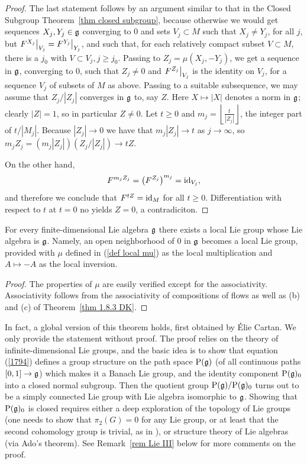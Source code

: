 \begin{proof}
    The last statement follows by an argument similar to that in the Closed Subgroup Theorem~\ref{thm closed subgroup}, because otherwise we would get sequences $X_j,Y_j\in\mathfrak{g}$ converging to $0$ and sets $V_j\subset M$ such that $X_j\neq Y_j$, for all $j$, but $\restr{F^{X_j}}{V_j}=\restr{F^{Y_j}}{Y_j}$, and such that, for each relatively compact subset $V\subset M$, there is a $j_0$ with $V\subset V_j,j\geq j_0$. Passing to $Z_j=\mu(X_j,-Y_j)$, we get a sequence in $\mathfrak{g}$, converging to $0$, such that $Z_j\neq 0$ and $\restr{F^{Z_j}}{V_j}$ is the identity on $V_j$, for a sequence $V_j$ of subsets of $M$ as above. Passing to a suitable subsequence, we may assume that $Z_j/|Z_j|$ converges in $\mathfrak{g}$ to, say $Z$. Here $X\mapsto |X|$ denotes a norm in $\mathfrak{g}$; clearly $|Z|=1$, so in particular $Z\neq 0$. Let $t\geq 0$ and $m_j=\left\lfloor\frac{t}{|Z_j|}\right\rfloor$, the integer part of $t/|M_j|$. Because $|Z_j|\to 0$ we have that $m_j|Z_j|\to t$ as $j\to \infty$, so $m_j Z_j=(m_j|Z_j|)(Z_j/|Z_j|)\to tZ$.

    On the other hand,
    \[F^{m_jZ_j}=\left(F^{Z_j}\right)^{m_j}=\operatorname{id}_{V_j},\]
    and therefore we conclude that $F^{tZ}=\operatorname{id}_{M}$ for all $t\geq 0$. Differentiation with respect to $t$ at $t=0$ no yields $Z=0$, a contradiciton.
\end{proof}


\begin{thm}\label{thm local Lie's third}
    For every finite-dimensional Lie algebra $\mathfrak{g}$ there exists a local Lie group whose Lie algebra is $\mathfrak{g}$. Namely, an open neighborhood of $0$ in $\mathfrak{g}$ becomes a local Lie group, provided with $\mu$ defined in (\ref{def local mu}) as the local multiplication and $A\mapsto -A$ as the local inversion.
\end{thm}
\begin{proof}
    The properties of $\mu$ are easily verified except for the associativity. Associativity follows from the associativity of compositions of flows as well as (b) and (c) of Theorem~\ref{thm 1.8.3 DK}.
\end{proof}

In fact, a global version of this theorem holds, first obtained by \'Elie Cartan. We only provide the statement without proof. The proof relies on the theory of infinite-dimensional Lie groups, and the basic idea is to show that equation (\ref{1794}) defines a group structure on the path space $\mathrm{P}(\mathfrak{g})$ (of all continuous paths $[0,1]\to \mathfrak{g}$) which makes it a Banach Lie group, and the identity component $\mathrm{P}(\mathfrak{g})_0$ into a closed normal subgroup. Then the quotient group $\mathrm{P}(\mathfrak{g})/\mathrm{P}(\mathfrak{g})_0$ turns out to be a simply connected Lie group with Lie algebra isomorphic to $\mathfrak{g}$. Showing that $\mathrm{P}(\mathfrak{g})_0$ is closed requires either a deep exploration of the topology of Lie groups (one needs to show that $\pi_2(G)=0$ for any Lie group, or at least that the second cohomology group is trivial, as in \cite{DK}), or structure theory of Lie algebras (via Ado's theorem). See Remark~\ref{rem Lie III} below for more comments on the proof.

